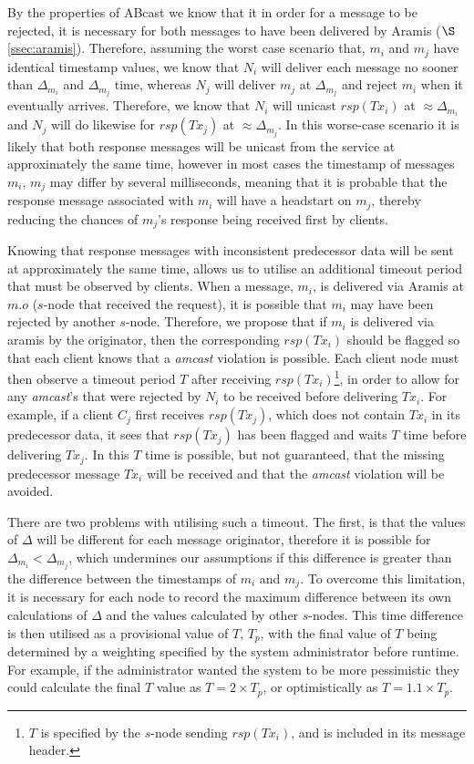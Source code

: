    By the properties of \textsf{ABcast} we know that it in order for a message to be rejected, it is necessary for both messages to have been delivered by \textsf{Aramis} ($\S$ \ref{ssec:aramis}).  Therefore, assuming the worst case scenario that, $m_i$ and $m_j$ have identical timestamp values, we know that $N_i$ will deliver each message no sooner than $\Delta_{m_i}$ and $\Delta_{m_j}$ time, whereas $N_j$ will deliver $m_j$ at $\Delta_{m_j}$ and reject $m_i$ when it eventually arrives.  Therefore, we know that $N_i$ will unicast $rsp(Tx_i)$ at $\approx \Delta_{m_i}$ and $N_j$ will do likewise for $rsp(Tx_j)$ at $\approx \Delta_{m_j}$.  In this worse-case scenario it is likely that both response messages will be unicast from the service at approximately the same time, however in most cases the timestamp of messages $m_i$, $m_j$ may differ by several milliseconds, meaning that it is probable that the response message associated with $m_i$ will have a headstart on $m_j$, thereby reducing the chances of $m_j$'s response being received first by clients.  
    
    Knowing that response messages with inconsistent predecessor data will be sent at approximately the same time, allows us to utilise an additional timeout period that must be observed by clients.  When a message, $m_i$, is delivered via \textsf{Aramis} at $m.o$ ($s$-node that received the request), it is possible that $m_i$ may have been rejected by another $s$-node.  Therefore, we propose that if $m_i$ is delivered via \textsf{aramis} by the originator, then the corresponding $rsp(Tx_i)$ should be flagged so that each client knows that a \emph{amcast} violation is possible.  Each client node must then observe a timeout period $T$ after receiving $rsp(Tx_i)$\footnote{$T$ is specified by the $s$-node sending $rsp(Tx_i)$, and is included in its message header.}, in order to allow for any \emph{amcast}'s that were rejected by $N_i$ to be received before delivering $Tx_i$.  For example, if a client $C_j$ first receives $rsp(Tx_j)$, which does not contain $Tx_i$ in its predecessor data, it sees that $rsp(Tx_j)$ has been flagged and waits $T$ time before delivering $Tx_j$. In this $T$ time is possible, but not guaranteed, that the missing predecessor message $Tx_i$ will be received and that the \emph{amcast} violation will be avoided.  
    
    There are two problems with utilising such a timeout.  The first, is that the values of $\Delta$ will be different for each message originator, therefore it is possible for $\Delta_{m_i} < \Delta_{m_j}$, which undermines our assumptions if this difference is greater than the difference between the timestamps of $m_i$ and $m_j$.  To overcome this limitation, it is necessary for each node to record the maximum difference between its own calculations of $\Delta$ and the values calculated by other $s$-nodes.  This time difference is then utilised as a provisional value of $T$, $T_p$, with the final value of $T$ being determined by a weighting specified by the system administrator before runtime.  For example, if the administrator wanted the system to be more pessimistic they could calculate the final $T$ value as $T=2 \times T_p$, or optimistically as $T=1.1 \times T_p$.  
    
